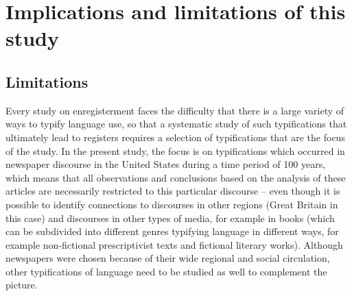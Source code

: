 \chapter{Implications and limitations of this study}
\label{bkm:Ref13473653}\hypertarget{Toc63021251}{}\section{Limitations}
\hypertarget{Toc63021252}{}
Every study on enregisterment faces the difficulty that there is a large variety of ways to typify language use, so that a systematic study of such typifications that ultimately lead to registers requires a selection of typifications that are the focus of the study. In the present study, the focus is on typifications which occurred in newspaper discourse in the United States during a time period of 100 years, which means that all observations and conclusions based on the analysis of these articles are necessarily restricted to this particular discourse – even though it is possible to identify connections to discourses in other regions (Great Britain in this case) and discourses in other types of media, for example in books (which can be subdivided into different genres typifying language in different ways, for example non-fictional prescriptivist texts and fictional literary works). Although newspapers were chosen because of their wide regional and social circulation, other typifications of language need to be studied as well to complement the picture.


